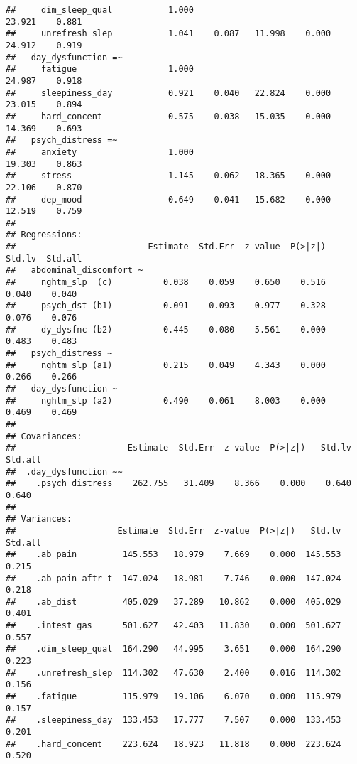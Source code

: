 \documentclass[
  man]{apa6}
\begin{document}
\begin{verbatim}
##     dim_sleep_qual           1.000                              23.921    0.881
##     unrefresh_slep           1.041    0.087   11.998    0.000   24.912    0.919
##   day_dysfunction =~                                                           
##     fatigue                  1.000                              24.987    0.918
##     sleepiness_day           0.921    0.040   22.824    0.000   23.015    0.894
##     hard_concent             0.575    0.038   15.035    0.000   14.369    0.693
##   psych_distress =~                                                            
##     anxiety                  1.000                              19.303    0.863
##     stress                   1.145    0.062   18.365    0.000   22.106    0.870
##     dep_mood                 0.649    0.041   15.682    0.000   12.519    0.759
## 
## Regressions:
##                          Estimate  Std.Err  z-value  P(>|z|)   Std.lv  Std.all
##   abdominal_discomfort ~                                                      
##     nghtm_slp  (c)          0.038    0.059    0.650    0.516    0.040    0.040
##     psych_dst (b1)          0.091    0.093    0.977    0.328    0.076    0.076
##     dy_dysfnc (b2)          0.445    0.080    5.561    0.000    0.483    0.483
##   psych_distress ~                                                            
##     nghtm_slp (a1)          0.215    0.049    4.343    0.000    0.266    0.266
##   day_dysfunction ~                                                           
##     nghtm_slp (a2)          0.490    0.061    8.003    0.000    0.469    0.469
## 
## Covariances:
##                      Estimate  Std.Err  z-value  P(>|z|)   Std.lv  Std.all
##  .day_dysfunction ~~                                                      
##    .psych_distress    262.755   31.409    8.366    0.000    0.640    0.640
## 
## Variances:
##                    Estimate  Std.Err  z-value  P(>|z|)   Std.lv  Std.all
##    .ab_pain         145.553   18.979    7.669    0.000  145.553    0.215
##    .ab_pain_aftr_t  147.024   18.981    7.746    0.000  147.024    0.218
##    .ab_dist         405.029   37.289   10.862    0.000  405.029    0.401
##    .intest_gas      501.627   42.403   11.830    0.000  501.627    0.557
##    .dim_sleep_qual  164.290   44.995    3.651    0.000  164.290    0.223
##    .unrefresh_slep  114.302   47.630    2.400    0.016  114.302    0.156
##    .fatigue         115.979   19.106    6.070    0.000  115.979    0.157
##    .sleepiness_day  133.453   17.777    7.507    0.000  133.453    0.201
##    .hard_concent    223.624   18.923   11.818    0.000  223.624    0.520

\end{verbatim}
\end{document}
